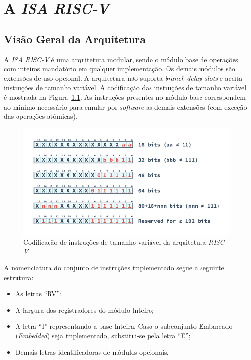 \chapter{A \textit{ISA RISC-V}}\label{CapISA}


\section{Visão Geral da Arquitetura}
{
    A \textit{ISA RISC-V} é uma arquitetura modular, sendo o módulo base de
    operações com inteiros mandatório em qualquer implementação. Os demais
    módulos são extensões de uso opcional. A arquitetura não suporta
    \textit{branch delay slots} e aceita instruções de tamanho variável. A
    codificação das instruções de tamanho variável é mostrada na
    Figura~\ref{fig:riscv_var_length}. As instruções presentes no módulo
    base correspondem ao mínimo necessário para emular por
    \textit{software} as demais extensões (com exceção das operações
    atômicas).
}

\begin{figure}[H]
\centering
    \includegraphics[width=1\linewidth]{../images/RV_InstructionLength.png}
    \caption{Codificação de instruções de tamanho variável da arquitetura
                \textit{RISC-V}}\label{fig:riscv_var_length}
\end{figure}

\clearpage

{
    A nomenclatura do conjunto de instruções implementado segue a
    seguinte estrutura:
}

\begin{itemize}[leftmargin=20mm]
    \item {As letras ``RV'';}
    \item {A largura dos registradores do módulo Inteiro;}
    \item {A letra ``I'' representando a base Inteira. Caso o subconjunto
            Embarcado (\textit{Embedded}) seja implementado, substitui-se
            pela letra ``E'';}
    \item {Demais letras identificadoras de módulos opcionais.}
\end{itemize}

